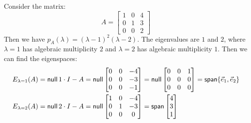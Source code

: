 \begin{example}
  Consider the matrix:
  \[
    A = \begin{bmatrix}
      1 & 0 & 4 \\
      0 & 1 & 3 \\
      0 & 0 & 2
    \end{bmatrix}
  \]
  Then we have $p_A (\lambda) = {(\lambda - 1)}^2 (\lambda - 2)$. The eigenvalues are $1$ and $2$, where $\lambda = 1$ has algebraic multiplicity $2$ and $\lambda = 2$ has algebraic multiplicity $1$. Then we can find the eigenspaces:
  \begin{align*}
    E_{\lambda = 1} (A) & = \operatorname{\text{\normalfont\sffamily null}}{1 \cdot I - A} = \operatorname{\text{\normalfont\sffamily null}} \begin{bmatrix}
                                                         0 & 0 & -4 \\
                                                         0 & 0 & -3 \\
                                                         0 & 0 & -1
                                                       \end{bmatrix} = \operatorname{\text{\normalfont\sffamily null}} \begin{bmatrix}
                                                                              0 & 0 & 1 \\
                                                                              0 & 0 & 0 \\
                                                                              0 & 0 & 0
                                                                            \end{bmatrix} = \operatorname{\text{\normalfont\sffamily span}} \{ \vec{e}_1, \vec{e}_2 \} \\
    E_{\lambda = 2} (A) & = \operatorname{\text{\normalfont\sffamily null}}{2 \cdot I - A} = \operatorname{\text{\normalfont\sffamily null}} \begin{bmatrix}
                                                         1 & 0 & -4 \\
                                                         0 & 1 & -3 \\
                                                         0 & 0 & 0
                                                       \end{bmatrix} = \operatorname{\text{\normalfont\sffamily span}} \begin{bmatrix}
                                                                              4 \\
                                                                              3 \\
                                                                              1

\end{bmatrix}
\end{align*}
\end{example}
